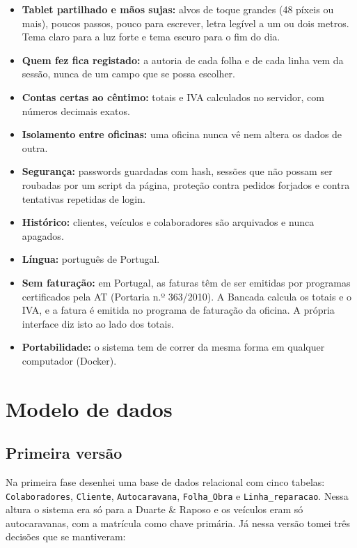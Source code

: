 \documentclass[a4paper,12pt]{article}
\begin{document}
\begin{itemize}
    \item \textbf{Tablet partilhado e mãos sujas:} alvos de toque grandes (48 píxeis ou mais), poucos passos, pouco para escrever, letra legível a um ou dois metros. Tema claro para a luz forte e tema escuro para o fim do dia.
    \item \textbf{Quem fez fica registado:} a autoria de cada folha e de cada linha vem da sessão, nunca de um campo que se possa escolher.
    \item \textbf{Contas certas ao cêntimo:} totais e \ac{IVA} calculados no servidor, com números decimais exatos.
    \item \textbf{Isolamento entre oficinas:} uma oficina nunca vê nem altera os dados de outra.
    \item \textbf{Segurança:} passwords guardadas com hash, sessões que não possam ser roubadas por um script da página, proteção contra pedidos forjados e contra tentativas repetidas de login.
    \item \textbf{Histórico:} clientes, veículos e colaboradores são arquivados e nunca apagados.
    \item \textbf{Língua:} português de Portugal.
    \item \textbf{Sem faturação:} em Portugal, as faturas têm de ser emitidas por programas certificados pela \ac{AT} (Portaria n.º 363/2010). A Bancada calcula os totais e o \ac{IVA}, e a fatura é emitida no programa de faturação da oficina. A própria interface diz isto ao lado dos totais.
    \item \textbf{Portabilidade:} o sistema tem de correr da mesma forma em qualquer computador (Docker).
\end{itemize}

\section{Modelo de dados}
\label{sec:dados}

\subsection{Primeira versão}

\begin{sloppypar}
Na primeira fase desenhei uma base de dados relacional com cinco tabelas: \texttt{Colaboradores}, \texttt{Cliente}, \texttt{Autocaravana}, \texttt{Folha\_Obra} e \texttt{Linha\_reparacao}. Nessa altura o sistema era só para a Duarte \& Raposo e os veículos eram só autocaravanas, com a matrícula como chave primária. Já nessa versão tomei três decisões que se mantiveram:
\end{sloppypar}
\end{document}
